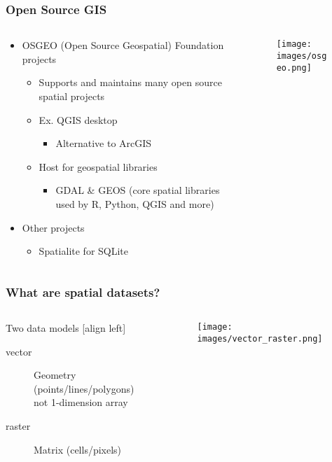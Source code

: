 \documentclass[11pt]{beamer}
\begin{document}
\begin{frame}
\frametitle{Open Source GIS}
\begin{columns}
\begin{column}{6cm}
\begin{itemize}
\item OSGEO (Open Source Geospatial) Foundation projects
\begin{itemize}
\item Supports and maintains many open source spatial projects
\item Ex. QGIS desktop 
\begin{itemize}
\item  Alternative to ArcGIS
\end{itemize}
\item Host for geospatial libraries
\begin{itemize}
\item  GDAL \& GEOS (core spatial libraries used by R, Python, QGIS and more)
\end{itemize}
\end{itemize}
\item Other projects
\begin{itemize}
\item  Spatialite for SQLite
\end{itemize}
\end{itemize}
\end{column}
\begin{column}{4cm}
\begin{figure}
\begin{center}
\texttt{[image: images/osgeo.png]}
\end{center}
\end{figure}
\end{column}
\end{columns}
\end{frame}

\begin{frame}
\frametitle{What are spatial datasets?}
\begin{columns}
\begin{column}{4cm}
Two data models
[align left]
\begin{description}
\item[vector] Geometry (points/lines/polygons)\\not 1-dimension array
\item[raster] Matrix (cells/pixels)
\end{description}
\end{column}
\begin{column}{6cm}
\begin{figure}
\begin{center}
\texttt{[image: images/vector\_raster.png]}
\end{center}
\end{figure}
\end{column}
\end{columns}
\end{frame}
\end{document}
